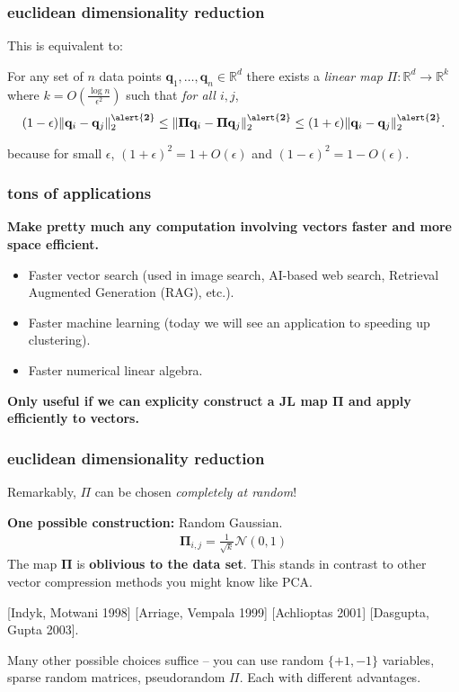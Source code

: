 \documentclass[compress]{beamer}
\newcommand{\bs}[1]{\boldsymbol{#1}}
\newcommand{\bv}[1]{\mathbf{#1}}
\newcommand{\R}{\mathbb{R}}
\begin{document}
\begin{frame}
	\frametitle{euclidean dimensionality reduction}
	This is equivalent to: 
	\begin{lemma}
		For any set of $n$ data points $\bv{q}_1,\ldots, \bv{q}_n \in \R^d$ there exists a \emph{linear map} $\Pi: \R^d \rightarrow \R^k$ where $k = O\left(\frac{\log n}{\epsilon^2}\right)$ such that \emph{for all $i,j$},
		\begin{align*}
			(1-\epsilon)\|\bv{q}_i - \bv{q}_j\|_2^{\mathbf{\alert{2}}} \leq \|\bs{\Pi}\bv{q}_i - \bs{\Pi}\bv{q}_j\|_2^{\mathbf{\alert{2}}} \leq (1+\epsilon)\|\bv{q}_i - \bv{q}_j\|_2^{\mathbf{\alert{2}}}.
		\end{align*}
	\end{lemma}
	because for small $\epsilon$, $(1+\epsilon)^2 = 1 + O(\epsilon)$ and $(1-\epsilon)^2 = 1 - O(\epsilon)$.
\end{frame}

\begin{frame}
	\frametitle{tons of applications}
	\textbf{Make pretty much any computation involving vectors faster and more space efficient.}
	\begin{itemize}
		\item Faster vector search (used in image search, AI-based web search, Retrieval Augmented Generation (RAG), etc.).
		\item Faster machine learning (today we will see an application to speeding up clustering).
		\item Faster numerical linear algebra. 
	\end{itemize}
	\begin{center}
		\alert{\textbf{Only useful if we can explicity construct a JL map $\bs{\Pi}$ and apply efficiently to vectors.}}
	\end{center}
\end{frame}

\begin{frame}
	\frametitle{euclidean dimensionality reduction}
	\begin{center}
		Remarkably, $\Pi$ can be chosen \emph{completely at random}!
	\end{center}
	\textbf{One possible construction:} Random Gaussian.
	\begin{align*}
		\bs{\Pi}_{i,j} = \frac{1}{\sqrt{k}} \mathcal{N}(0,1)
	\end{align*}
	The map $\bs{\Pi}$ is \textbf{\alert{oblivious to the data set}}. This stands in contrast to other vector compression methods you might know like PCA.
	
	[Indyk, Motwani 1998] [Arriage, Vempala 1999] [Achlioptas 2001] [Dasgupta, Gupta 2003].
	
	Many other possible choices suffice -- you can use random $\{+1,-1\}$ variables, sparse random matrices, pseudorandom $\Pi$. Each with different advantages. 
\end{frame}
\end{document}

